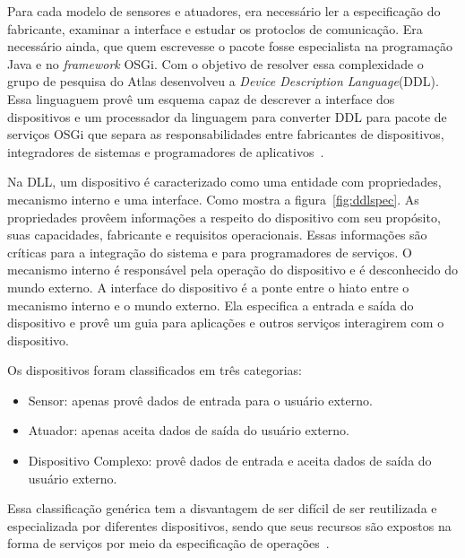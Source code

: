 Para cada modelo de sensores e atuadores, era necessário ler a especificação do fabricante, examinar a interface e estudar os protoclos de comunicação. Era necessário ainda, que quem escrevesse o pacote fosse especialista na programação Java e no \emph{framework} OSGi. Com o objetivo de resolver essa complexidade o grupo de pesquisa do Atlas desenvolveu a \emph{Device Description Language}(DDL). Essa linguaguem provê um esquema capaz de descrever a interface dos dispositivos e um processador da linguagem para converter DDL para pacote de serviços OSGi que separa as responsabilidades entre fabricantes de dispositivos, integradores de sistemas e programadores de aplicativos~\cite{gatorTechDDL}.

Na DLL, um dispositivo é caracterizado como uma entidade com propriedades, mecanismo interno e uma interface. Como mostra a figura~\ref{fig:ddlspec}. As propriedades provêem informações a respeito do dispositivo com seu propósito, suas capacidades, fabricante e requisitos operacionais. Essas informações são críticas para a integração do sistema e para programadores de serviços. O mecanismo interno é responsável pela operação do dispositivo e é desconhecido do mundo externo. A interface do dispositivo é a ponte entre o hiato entre o mecanismo interno e o mundo externo. Ela especifica a entrada e saída do dispositivo e provê um guia para aplicações e outros serviços interagirem com o dispositivo.

Os dispositivos foram classificados em três categorias:
\begin{itemize}
	\item Sensor: apenas provê dados de entrada para o usuário externo.
	\item Atuador: apenas aceita dados de saída do usuário externo.
	\item Dispositivo Complexo: provê dados de entrada e aceita dados de saída do usuário externo.
\end{itemize}

Essa classificação genérica tem a disvantagem de ser difícil de ser reutilizada e especializada por diferentes dispositivos, sendo que seus recursos são expostos na forma de serviços por meio da especificação de operações~\cite{ddlSpec}.
